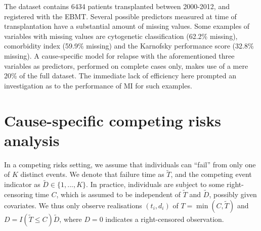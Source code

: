 \documentclass[
  letterpaper,
  paper=240mm:170mm,
  twoside=true,
  open=right,
  fontsize=10pt,
  pagesize=false,
  BCOR=15mm,
  DIV=14,
  headinclude=true,
  footinclude=false,
  headsepline=on]{scrbook}
\begin{document}
The dataset contains 6434 patients transplanted between 2000-2012, and
registered with the EBMT. Several possible predictors measured at time
of transplantation have a substantial amount of missing values. Some
examples of variables with missing values are cytogenetic classification
(62.2\% missing), comorbidity index (59.9\% missing) and the Karnofsky
performance score (32.8\% missing). A cause-specific model for relapse
with the aforementioned three variables as predictors, performed on
complete cases only, makes use of a mere 20\% of the full dataset. The
immediate lack of efficiency here prompted an investigation as to the
performance of MI for such examples.

\section{Cause-specific competing risks analysis}\label{sec-comprisks}

In a competing risks setting, we assume that individuals can ``fail''
from only one of \(K\) distinct events. We denote that failure time as
\(\tilde{T}\), and the competing event indicator as
\(\tilde{D} \in \{1,...,K\}\). In practice, individuals are subject to
some right-censoring time \(C\), which is assumed to be independent of
\(\tilde{T}\) and \(\tilde{D}\), possibly given covariates. We thus only
observe realisations \((t_i, d_i)\) of \(T = \min(C,\tilde{T})\) and
\(D = I(\tilde{T} \leq C)\tilde{D}\), where \(D = 0\) indicates a
right-censored observation.
\end{document}
